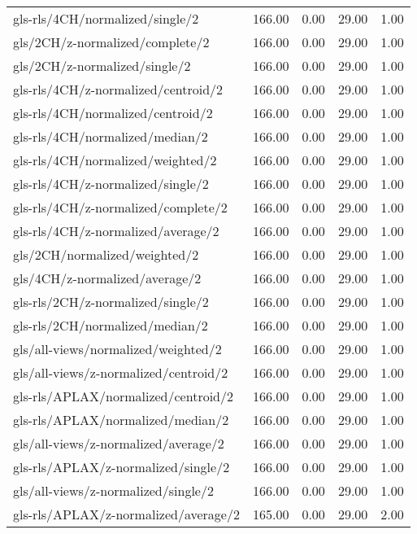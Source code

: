 \begin{longtable}{lrrrr}
    gls-rls/4CH/normalized/single/2           & 166.00 &  0.00 & 29.00 &  1.00 \\
    gls/2CH/z-normalized/complete/2           & 166.00 &  0.00 & 29.00 &  1.00 \\
    gls/2CH/z-normalized/single/2             & 166.00 &  0.00 & 29.00 &  1.00 \\
    gls-rls/4CH/z-normalized/centroid/2       & 166.00 &  0.00 & 29.00 &  1.00 \\
    gls-rls/4CH/normalized/centroid/2         & 166.00 &  0.00 & 29.00 &  1.00 \\
    gls-rls/4CH/normalized/median/2           & 166.00 &  0.00 & 29.00 &  1.00 \\
    gls-rls/4CH/normalized/weighted/2         & 166.00 &  0.00 & 29.00 &  1.00 \\
    gls-rls/4CH/z-normalized/single/2         & 166.00 &  0.00 & 29.00 &  1.00 \\
    gls-rls/4CH/z-normalized/complete/2       & 166.00 &  0.00 & 29.00 &  1.00 \\
    gls-rls/4CH/z-normalized/average/2        & 166.00 &  0.00 & 29.00 &  1.00 \\
    gls/2CH/normalized/weighted/2             & 166.00 &  0.00 & 29.00 &  1.00 \\
    gls/4CH/z-normalized/average/2            & 166.00 &  0.00 & 29.00 &  1.00 \\
    gls-rls/2CH/z-normalized/single/2         & 166.00 &  0.00 & 29.00 &  1.00 \\
    gls-rls/2CH/normalized/median/2           & 166.00 &  0.00 & 29.00 &  1.00 \\
    gls/all-views/normalized/weighted/2       & 166.00 &  0.00 & 29.00 &  1.00 \\
    gls/all-views/z-normalized/centroid/2     & 166.00 &  0.00 & 29.00 &  1.00 \\
    gls-rls/APLAX/normalized/centroid/2       & 166.00 &  0.00 & 29.00 &  1.00 \\
    gls-rls/APLAX/normalized/median/2         & 166.00 &  0.00 & 29.00 &  1.00 \\
    gls/all-views/z-normalized/average/2      & 166.00 &  0.00 & 29.00 &  1.00 \\
    gls-rls/APLAX/z-normalized/single/2       & 166.00 &  0.00 & 29.00 &  1.00 \\
    gls/all-views/z-normalized/single/2       & 166.00 &  0.00 & 29.00 &  1.00 \\
    gls-rls/APLAX/z-normalized/average/2      & 165.00 &  0.00 & 29.00 &  2.00 \\

\end{longtable}
